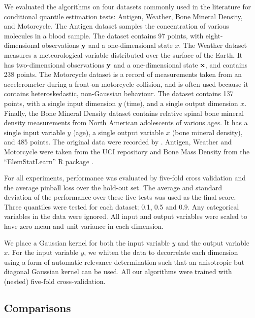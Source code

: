 \documentclass[twoside]{article} \usepackage{aistats2017}
\theoremstyle{definition}
\theoremstyle{theorem}
\begin{document}
	We evaluated the algorithms on four datasets commonly used in the literature for conditional quantile estimation tests: Antigen, Weather, Bone Mineral Density, and Motorcycle. The Antigen dataset samples the concentration of various molecules \citep{Quadrianto2009} in a blood sample. The dataset contains 97 points, with eight-dimensional observations $\mathbf{y}$ and a one-dimensional state $x$. The Weather dataset measures a meteorological variable distributed over the surface of the Earth. It has two-dimensional observations $\mathbf{y}$ and a one-dimensional state $\mathbf{x}$, and contains 238 points. The Motorcycle dataset is a record of measurements taken from an accelerometer during a front-on motorcycle collision, and is often used because it contains heteroskedastic, non-Gaussian behaviour. The dataset contains 137 points, with a single input dimension $y$ (time), and a single output dimension $x$. Finally, the Bone Mineral Density dataset contains relative spinal bone mineral density measurements from North American adolescents of various ages. It has a single input variable $y$ (age), a single output variable $x$ (bone mineral density), and 485 points. The original data were recorded by \cite{Bachrach1999}. Antigen, Weather and Motorcycle were taken from the UCI repository \citep{Bache2013} and Bone Mass Density from the ``ElemStatLearn'' R package \citep{Hastie2005}.
	
	For all experiments, performance was evaluated by five-fold cross validation and the average pinball loss over the hold-out set. The average and standard deviation of the performance over these five tests was used as the final score. Three quantiles were tested for each dataset; 0.1, 0.5 and 0.9. Any categorical variables in the data were ignored. All input and output variables were scaled to have zero mean and unit variance in each dimension.
	
	We place a Gaussian kernel for both the input variable $y$ and the output variable $x$. For the input variable $y$, we whiten the data to decorrelate each dimension using a form of automatic relevance determination \citep{Rasmussen2006} such that an anisotropic but diagonal Gaussian kernel can be used. All our algorithms were trained with (nested) five-fold cross-validation.
	
	\subsection{Comparisons}
	\label{sec:experiments:comparison}
	
\end{document}
